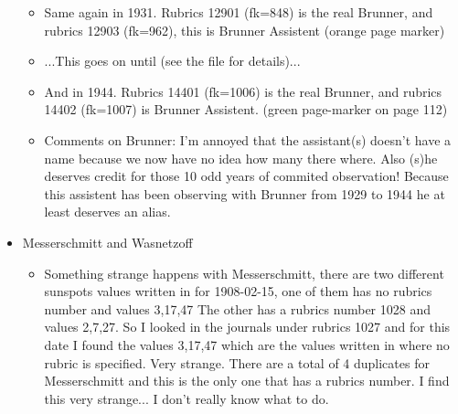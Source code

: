 \documentclass[12pt]{article}
\begin{document}
\begin{itemize}
\begin{itemize}
    \item Same again in 1931. Rubrics 12901 (fk=848) is the real Brunner, and rubrics 12903 (fk=962), this is Brunner Assistent (orange page marker)
    \item ...This goes on until (see the file for details)...
    \item And in 1944. Rubrics 14401 (fk=1006) is the real Brunner, and rubrics 14402 (fk=1007) is Brunner Assistent. (green page-marker on page 112)
    \item Comments on Brunner: I'm annoyed that the assistant(s) doesn't have a name because we now have no idea how many there where. Also (s)he deserves credit for those 10 odd years of commited observation! Because this assistent has been observing with Brunner from 1929 to 1944 he at least deserves an alias. 
\end{itemize}
\item Messerschmitt and Wasnetzoff
\begin{itemize}
    \item Something strange happens with Messerschmitt, there are two different sunspots values written in for 1908-02-15, one of them has no rubrics number and values 3,17,47 The other has a rubrics number 1028 and values 2,7,27. So I looked in the journals under rubrics 1027 and for this date I found the values 3,17,47 which are the values written in where no rubric is specified. Very strange. There are a total of 4 duplicates for Messerschmitt and this is the only one that has a rubrics number. I find this very strange... I don't really know what to do. 
\end{itemize}
\end{itemize}
    
\end{document}

